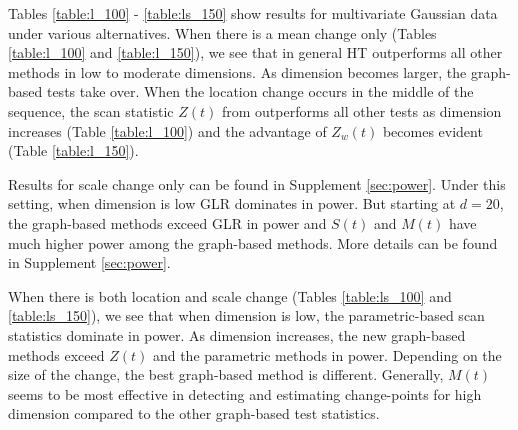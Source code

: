\documentclass[arxiv, preprint]{imsart}
\numberwithin{equation}{section}
\theoremstyle{plain}
\begin{document}
Tables \ref{table:l_100} - \ref{table:ls_150} show results for multivariate Gaussian data under various alternatives.  When there is a mean change only (Tables \ref{table:l_100} and \ref{table:l_150}), we see that in general HT outperforms all other methods in low to moderate dimensions.  As dimension becomes larger, the graph-based tests take over.  When the location change occurs in the middle of the sequence, the scan statistic $Z(t)$ from \cite{chen2015graph} outperforms all other tests as dimension increases (Table \ref{table:l_100}) and the advantage of $Z_w(t)$ becomes evident (Table \ref{table:l_150}).  %


Results for scale change only can be found in Supplement \ref{sec:power}. Under this setting, when dimension is low GLR dominates in power. But starting at $d=20$, the graph-based methods exceed GLR in power and $S(t)$ and $M(t)$ have much higher power among the graph-based methods. More details can be found in Supplement \ref{sec:power}. 

When there is both location and scale change (Tables \ref{table:ls_100} and \ref{table:ls_150}), we see that when dimension is low, the parametric-based scan statistics dominate in power. As dimension increases, the new graph-based methods exceed $Z(t)$ and the parametric methods in power. Depending on the size of the change, the best graph-based method is different.
Generally, $M(t)$ seems to be most effective in detecting and estimating change-points for high dimension compared to the other graph-based test statistics. 
\end{document}
